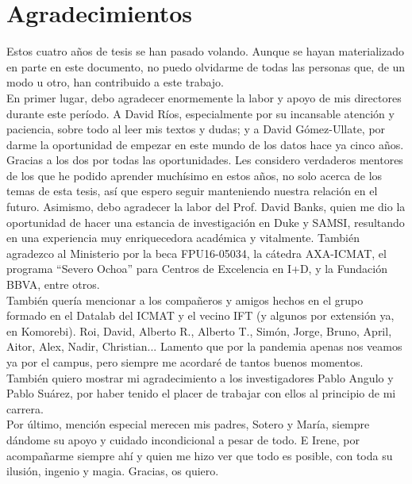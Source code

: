 \documentclass[a4paper, 11pt, openright, twoside]{reportPhD}
\numberwithin{figure}{chapter}
\numberwithin{table}{chapter}
\numberwithin{equation}{chapter}
\begin{document}

\chapter*{Agradecimientos}

Estos cuatro años de tesis se han pasado volando. Aunque se hayan materializado en parte en este documento, no puedo olvidarme de todas las personas que, de un modo u otro, han contribuido a este trabajo. \\

En primer lugar, debo agradecer enormemente la labor y apoyo de mis directores durante este período. A David Ríos, especialmente por su incansable atención y paciencia, sobre todo al leer mis textos y dudas; y a David Gómez-Ullate, por darme la oportunidad de empezar en este mundo de los datos hace ya cinco años. Gracias a los dos por todas las oportunidades. Les considero verdaderos mentores de los que he podido aprender muchísimo en estos años, no solo acerca de los temas de esta tesis, así que espero seguir manteniendo nuestra relación en el futuro. 
Asimismo, debo agradecer la labor del Prof. David Banks, quien me dio la oportunidad de hacer una estancia de investigación en Duke y SAMSI, resultando en una experiencia muy enriquecedora académica y vitalmente. También agradezco al Ministerio por la beca FPU16-05034, la cátedra AXA-ICMAT, el programa “Severo Ochoa”
para Centros de Excelencia en I+D, y la Fundación BBVA, entre otros. \\

También quería mencionar a los compañeros y amigos hechos en el grupo formado en el Datalab del ICMAT y el vecino IFT (y algunos por extensión ya, en Komorebi). Roi, David, Alberto R., Alberto T., Simón, Jorge, Bruno, April, Aitor, Alex, Nadir, Christian... 
Lamento que por la pandemia apenas nos veamos ya por el campus, pero siempre me acordaré de tantos buenos momentos. También quiero mostrar mi agradecimiento a los investigadores Pablo Angulo y Pablo Suárez, por haber tenido el placer de trabajar con ellos al principio de mi carrera.  \\

Por último, mención especial merecen mis padres, Sotero y María, siempre dándome su apoyo y cuidado incondicional a pesar de todo. E Irene, por acompañarme siempre ahí y quien me hizo ver que todo es posible, con toda su ilusión, ingenio y magia. Gracias, os quiero.
\end{document}
